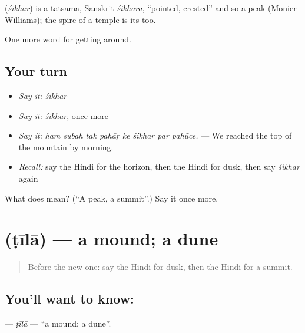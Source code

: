 \begin{cousinweb}
\textbf{} (\emph{śikhar}) is a tatsama, Sanskrit \emph{śikhara}, \textquotedblleft{}pointed, crested\textquotedblright{} and so a peak (Monier-Williams); the spire of a temple is its  too.
\end{cousinweb}

\begin{grammarlens}[title={What you've built}]
One more word for getting around.
\end{grammarlens}

\subsection*{Your turn}
\begin{itemize}
\raggedright
  \item \emph{Say it:} \emph{śikhar}
  \item \emph{Say it:} \emph{śikhar}, once more
  \item \emph{Say it:} \emph{ham subah tak pahāṛ ke śikhar par pahũce.} — We reached the top of the mountain by morning.
  \item \emph{Recall:} say the Hindi for the horizon, then the Hindi for dusk, then say \emph{śikhar} again
\end{itemize}

\begin{tcolorbox}[breakable,colback=teal!4,colframe=teal!35!black,title={Before you move on}]
What does  mean? (\textquotedblleft{}A peak, a summit\textquotedblright{}.) Say it once more.
\end{tcolorbox}
\section[\texorpdfstring{\hi{टीला} (ṭīlā)}{टीला (ṭīlā)}]{ (ṭīlā) — a mound; a dune}

\label{lesson:HI-C442-tila}



\begin{quote}
Before the new one: say the Hindi for dusk, then the Hindi for a summit.
\end{quote}

\subsection*{You'll want to know: }
\textbf{} — \emph{ṭīlā} — \textquotedblleft{}a mound; a dune\textquotedblright{}.

